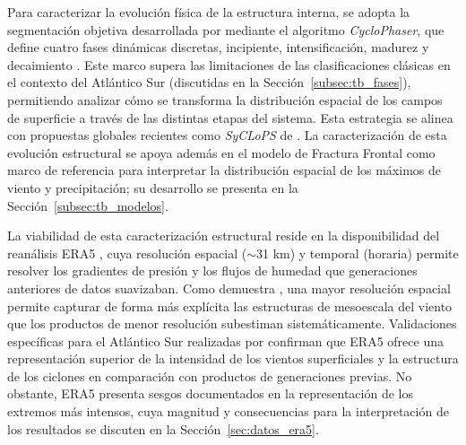 Para caracterizar la evolución física de la estructura interna, se adopta la segmentación objetiva desarrollada por \citet{coutodesouza2024new} mediante el algoritmo \textit{CycloPhaser}, que define cuatro fases dinámicas discretas, incipiente, intensificación, madurez y decaimiento \citep{deSouza2025CycloPhaser}. 
Este marco supera las limitaciones de las clasificaciones clásicas en el contexto del Atlántico Sur (discutidas en la Sección~\ref{subsec:tb_fases}), permitiendo analizar cómo se transforma la distribución espacial de los campos de superficie a través de las distintas etapas del sistema. Esta estrategia se alinea con propuestas globales recientes como \textit{SyCLoPS} de \citet{han2025system}. 
La caracterización de esta evolución estructural se apoya además en el modelo de Fractura Frontal \citep{shapiro1990life,shapiro1999bridge} como marco de referencia para interpretar la distribución espacial de los máximos de viento y precipitación; su desarrollo se presenta en la Sección~\ref{subsec:tb_modelos}.

La viabilidad de esta caracterización estructural reside en la disponibilidad del reanálisis ERA5 \citep{hersbach2020era5}, cuya resolución espacial ($\sim$31 km) y temporal (horaria) permite resolver los gradientes de presión y los flujos de humedad que generaciones anteriores de datos suavizaban. Como demuestra \citet{priestley2022improved}, una mayor resolución espacial permite capturar de forma más explícita las estructuras de mesoescala del viento que los productos de menor resolución subestiman sistemáticamente. Validaciones específicas para el Atlántico Sur realizadas por \citet{gramcianinov2020analysis} confirman que ERA5 ofrece una representación superior de la intensidad de los vientos superficiales y la estructura de los ciclones en comparación con productos de generaciones previas. No obstante, ERA5 presenta sesgos documentados en la representación de los extremos más intensos, cuya magnitud y consecuencias para la interpretación de los resultados se discuten en la Sección~\ref{sec:datos_era5}.


